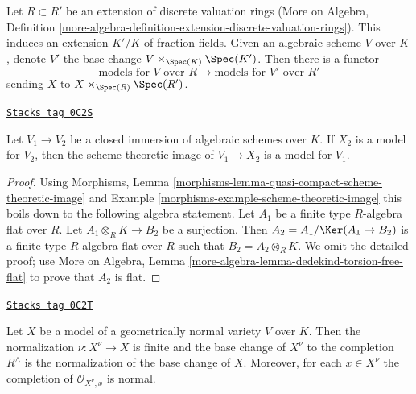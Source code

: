 \medskip\noindent
Let $R \subset R'$ be an extension of discrete valuation rings
(More on Algebra, Definition
\ref{more-algebra-definition-extension-discrete-valuation-rings}).
This induces an extension $K'/K$ of fraction fields.
Given an algebraic scheme $V$ over $K$, denote $V'$ the
base change $V \times_{\Spec(K)} \Spec(K')$. Then there is
a functor
$$
\text{models for }V\text{ over }R
\longrightarrow
\text{models for }V'\text{ over }R'
$$
sending $X$ to $X \times_{\Spec(R)} \Spec(R')$.

\begin{lemma}
\label{models-lemma-closure-is-model}
\href{https://stacks.math.columbia.edu/tag/0C2S}{\texttt{Stacks tag 0C2S}}

Let $V_1 \to V_2$ be a closed immersion of algebraic schemes over $K$.
If $X_2$ is a model for $V_2$, then the scheme theoretic image
of $V_1 \to X_2$ is a model for $V_1$.
\end{lemma}

\begin{proof}
Using
Morphisms, Lemma \ref{morphisms-lemma-quasi-compact-scheme-theoretic-image} and
Example \ref{morphisms-example-scheme-theoretic-image}
this boils down to the following algebra statement.
Let $A_1$ be a finite type $R$-algebra flat over $R$.
Let $A_1 \otimes_R K \to B_2$ be a surjection. Then
$A_2 = A_1 / \Ker(A_1 \to B_2)$ is a finite type $R$-algebra
flat over $R$ such that $B_2 = A_2 \otimes_R K$.
We omit the detailed proof; use
More on Algebra, Lemma \ref{more-algebra-lemma-dedekind-torsion-free-flat}
to prove that $A_2$ is flat.
\end{proof}

\begin{lemma}[Normalization]
\label{models-lemma-normalization}
\href{https://stacks.math.columbia.edu/tag/0C2T}{\texttt{Stacks tag 0C2T}}

Let $X$ be a model of a geometrically normal variety $V$ over $K$.
Then the normalization $\nu : X^\nu \to X$ is finite and
the base change of $X^\nu$ to the completion $R^\wedge$
is the normalization of the base change of $X$. Moreover, for
each $x \in X^\nu$ the completion of $\mathcal{O}_{X^\nu, x}$
is normal.
\end{lemma}

